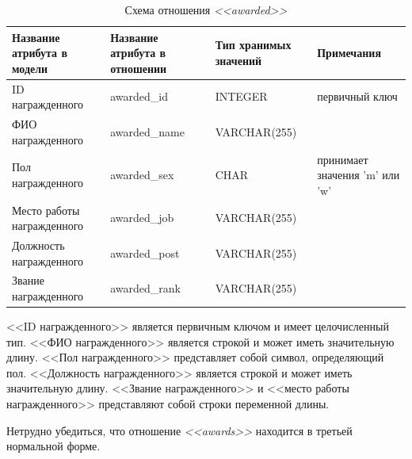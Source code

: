 \begin{table}[h!]


  \caption{Схема отношения \textit{<<awarded>>}}
  \label{tbl:awarded_scheme}
  \small{
    \centering
    \begin{tabular}{| p{} | p{} | p{} | p{} |}
      \hline
      Название атрибута \newline в модели &
      Название атрибута \newline в отношении &
      Тип хранимых \newline значений &
      Примечания \\ \hline

      ID награжденного &
      awarded\_id &
      INTEGER &
      первичный ключ \\
      \hline

      ФИО награжденного &
      awarded\_name &
      VARCHAR(255) & \\
      \hline

      Пол награжденного &
      awarded\_sex &
      CHAR &
      принимает значения 'm' или 'w' \\
      \hline

      Место работы \newline награжденного &
      awarded\_job &
      VARCHAR(255) & \\
      \hline

      Должность \newline награжденного &
      awarded\_post &
      VARCHAR(255) & \\
      \hline

      Звание \newline награжденного &
      awarded\_rank &
      VARCHAR(255) & \\
      \hline

    \end{tabular}
  }
\end{table}

<<ID награжденного>> является первичным ключом и имеет целочисленный тип.
<<ФИО награжденного>> является строкой и может иметь значительную длину.
<<Пол награжденного>> представляет собой символ, определяющий пол.
<<Должность награжденного>> является строкой и может иметь значительную длину.
<<Звание награжденного>> и <<место работы награжденного>> представляют собой строки переменной длины.

Нетрудно убедиться, что отношение \textit{<<awards>>} находится в третьей
нормальной форме.

